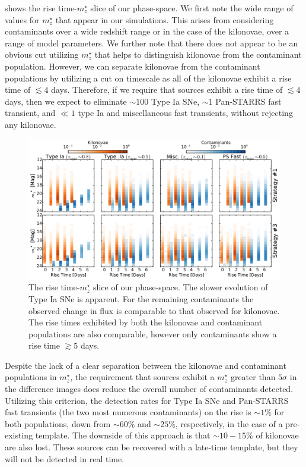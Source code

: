  shows the rise time-$m^{\star}_z$ slice of our phase-space. We first note the wide range of values for $m^{\star}_z$ that appear in our simulations. This arises from considering contaminants over a wide redshift range or in the case of the kilonovae, over a range of model parameters. We further note that there does not appear to be an obvious cut utilizing $m^{\star}_z$ that helps to distinguish kilonovae from the contaminant population. However, we can separate kilonovae from the contaminant populations by utilizing a cut on timescale as all of the kilonovae exhibit a rise time of $\lesssim 4$ days. Therefore, if we require that sources exhibit a rise time of $\lesssim 4$ days, then we expect to eliminate $\sim 100$ Type Ia SNe, $\sim 1$ Pan-STARRS fast transient, and $\ll1$ type Ia and miscellaneous fast transients, without rejecting any kilonovae.

\begin{figure}[t!]
\centering
\includegraphics[width=\textwidth]{./figs/chapter2/f15.pdf}
\caption{\singlespace The rise time-$m^{\star}_z$ slice of our phase-space. The slower evolution of Type Ia SNe is apparent. For the remaining contaminants the observed change in flux is comparable to that observed for kilonovae. The rise times exhibited by both the kilonovae and contaminant populations are also comparable, however only contaminants show a rise time $\gtrsim 5$ days.}
\label{fig:ch2_phaserisediff_df}
\end{figure}

\clearpage
Despite the lack of a clear separation between the kilonovae and contaminant populations in $m^{\star}_z$, the requirement that sources exhibit a $m^{\star}_z$ greater than $5\sigma$ in the difference images does reduce the overall number of contaminants detected. Utilizing this criterion, the detection rates for Type Ia SNe and Pan-STARRS fast transients (the two most numerous contaminants) on the rise is $\sim1\%$ for both populations, down from $\sim60\%$ and $\sim25\%$, respectively, in the case of a pre-existing template. The downside of this approach is that $\sim10-15\%$ of kilonovae are also lost. These sources can be recovered with a late-time template, but they will not be detected in real time. 

